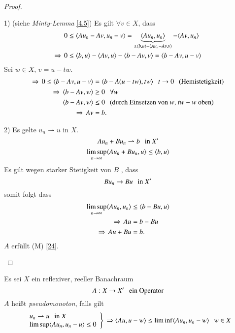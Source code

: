 \begin{proof}
    \begin{description}
        \item{1) (siehe \textit{Minty-Lemma} \ref{4.5})} Es  gilt $\forall v \in X$, dass
        \begin{align*}
            0&\leq \langle Au_n-Av, u_n-v \rangle = \underbrace{\langle Au_n,u_n\rangle}_{\leq \langle b,u\rangle-
            \langle Au_n-Av,v\rangle} - \langle Av,u_n\rangle\\
            \Rightarrow \, 0&\leq \langle b,u\rangle- \langle Av,u\rangle - \langle b-Av,v\rangle= \langle b-Av,u-v\rangle
        \end{align*}
        Sei $w \in X$, $v=u-tw$.
        \begin{align*}
            \Rightarrow \, 0\leq \langle b-Av,u-v\rangle &= \langle b-A(u-tw),tw\rangle \hspace{.25cm} t\rightarrow 0 \hspace{.25cm}
            \text{(Hemistetigkeit)}\\
            \Rightarrow \, \langle b-Av, w \rangle &\geq 0 \hspace{.25cm} \forall w\\
            \langle b-Av, w \rangle &\leq 0 \hspace{.25cm} \text{(durch Einsetzen von $w$, $tw-w$ oben)}\\
            \Rightarrow \, Av&= b .
        \end{align*}
        \item{2)}
        Es gelte $u_n \rightharpoonup u $ in $X$.
        \[
            Au_n+Bu_n \rightharpoonup b \hspace{.25cm} \text{in }X'
        \]
        \[
            \limsup_{n\rightarrow \infty} \langle Au_n+ Bu_n,u \rangle\leq \langle b,u\rangle
        \]
        Es gilt wegen starker Stetigkeit von $B$ , dass
        \[
            Bu_n\rightarrow Bu \hspace{.25cm} \text{in }X'
        \]
        somit folgt dass
        \begin{align*}
            \limsup _{n\rightarrow \infty} \langle Au_n,u_n\rangle & \leq \langle b-Bu,u\rangle\\
            \Rightarrow \, Au&= b - Bu\\
            \Rightarrow \, Au + Bu &= b.
        \end{align*}
        $A$ erfüllt (M) \ref{24}.
    \end{description}
    \[ \]
\end{proof}

\begin{defi}[Pseudomonotonie] \label{4.15}
    Es sei $X$ ein reflexiver, reeller Banachraum
    \[
        A: X\rightarrow X' \hspace{.25cm} \text{ein Operator}
    \]
    $A$ heißt \textit{pseudomonoton}, falls gilt
    \begin{align*}
        \left.
        \begin{array}{ll}
            u_n \rightharpoonup u \hspace{.25cm} \text{in } X\\ \limsup\langle Au_n,u_n-u\rangle \leq 0
        \end{array}
        \right\}
        \, \Rightarrow \langle Au, u-w\rangle \leq \liminf \langle Au_n, u_n - w \rangle \hspace{.25cm} w\in X
    \end{align*}
\end{defi}

